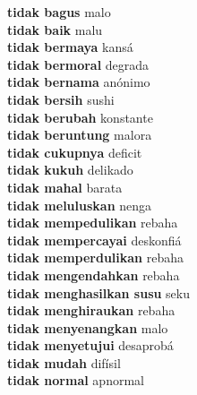 \textbf{ tidak bagus  } malo \\
\textbf{ tidak baik  } malu \\
\textbf{ tidak bermaya  } kansá \\
\textbf{ tidak bermoral  } degrada \\
\textbf{ tidak bernama  } anónimo \\
\textbf{ tidak bersih  } sushi \\
\textbf{ tidak berubah  } konstante \\
\textbf{ tidak beruntung  } malora \\
\textbf{ tidak cukupnya  } deficit \\
\textbf{ tidak kukuh  } delikado \\
\textbf{ tidak mahal  } barata \\
\textbf{ tidak meluluskan  } nenga \\
\textbf{ tidak mempedulikan  } rebaha \\
\textbf{ tidak mempercayai  } deskonfiá \\
\textbf{ tidak memperdulikan  } rebaha \\
\textbf{ tidak mengendahkan  } rebaha \\
\textbf{ tidak menghasilkan susu  } seku \\
\textbf{ tidak menghiraukan  } rebaha \\
\textbf{ tidak menyenangkan  } malo \\
\textbf{ tidak menyetujui  } desaprobá \\
\textbf{ tidak mudah  } difísil \\
\textbf{ tidak normal  } apnormal \\
